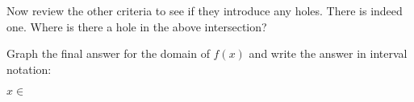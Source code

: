 \documentclass[letterpaper,12pt,fleqn]{article}
\begin{document}
\vspace{0.25in}

\begin{minipage}{\textwidth}
  \centering
\end{minipage}

\vspace{0.25in}

Now review the other criteria to see if they introduce any holes. There is
indeed one. Where is there a hole in the above intersection?

\vspace{0.5in}

Graph the final answer for the domain of $f(x)$ and write the answer in
interval notation:

\vspace{0.25in}

\begin{minipage}{\textwidth}
  \centering
\end{minipage}

\vspace{0.25in}

$x\in$
\end{document}
